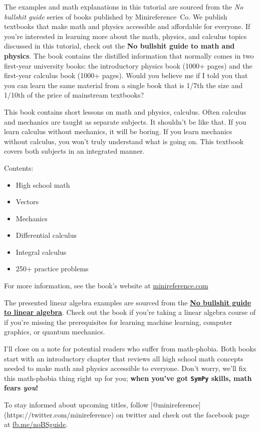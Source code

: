 \documentclass{article}
\begin{document}
The examples and math explanations in this tutorial are sourced from the
\emph{No bullshit guide} series of books published by Minireference~Co.
We publish textbooks that make math and physics accessible and
affordable for everyone. If you're interested in learning more about the
math, physics, and calculus topics discussed in this tutorial, check out
the \textbf{No bullshit guide to math and physics}. The book contains
the distilled information that normally comes in two first-year
university books: the introductory physics book (1000+ pages) and the
first-year calculus book (1000+ pages). Would you believe me if I told
you that you can learn the same material from a single book that is
1/7th the size and 1/10th of the price of mainstream textbooks?

This book contains short lessons on math and physics, calculus. Often
calculus and mechanics are taught as separate subjects. It shouldn't be
like that. If you learn calculus without mechanics, it will be boring.
If you learn mechanics without calculus, you won't truly understand what
is going on. This textbook covers both subjects in an integrated manner.

Contents:

\begin{itemize}
\itemsep1pt\parskip0pt
\item
  High school math
\item
  Vectors
\item
  Mechanics
\item
  Differential calculus
\item
  Integral calculus
\item
  250+ practice problems
\end{itemize}

For more information, see the book's website at
\href{http://minireference.com/}{minireference.com}

The presented linear algebra examples are sourced from the
\href{https://gum.co/noBSLA}{\textbf{No bullshit guide to linear
algebra}}. Check out the book if you're taking a linear algebra course
of if you're missing the prerequisites for learning machine learning,
computer graphics, or quantum mechanics.

I'll close on a note for potential readers who suffer from math-phobia.
Both books start with an introductory chapter that reviews all high
school math concepts needed to make math and physics accessible to
everyone. Don't worry, we'll fix this math-phobia thing right up for
you; \textbf{when you've got \texttt{SymPy} skills, math fears
\emph{you}!}

To stay informed about upcoming titles, follow
{[}@minireference{]}(https://twitter.com/minireference) on twitter and
check out the facebook page at
\href{http://fb.me/noBSguide}{fb.me/noBSguide}.


    
    
    
    
\end{document}

